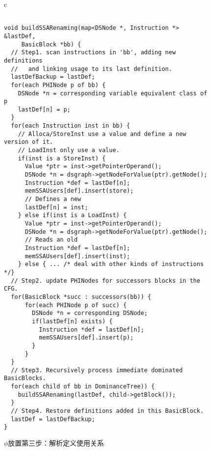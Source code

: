 \begin{figure}[htbp]
\centering
\begin{tabular}{c}
\begin{lstlisting}

void buildSSARenaming(map<DSNode *, Instruction *> &lastDef,
     BasicBlock *bb) {
  // Step1. scan instructions in 'bb', adding new definitions 
  //   and linking usage to its last definition.
  lastDefBackup = lastDef;
  for(each PHINode p of bb) {
    DSNode *n = corresponding variable equivalent class of p
    lastDef[n] = p;
  }
  for(each Instruction inst in bb) {
    // Alloca/StoreInst use a value and define a new version of it.
    // LoadInst only use a value.
    if(inst is a StoreInst) {
      Value *ptr = inst->getPointerOperand();
      DSNode *n = dsgraph->getNodeForValue(ptr).getNode();
      Instruction *def = lastDef[n];
      memSSAUsers[def].insert(store);
      // Defines a new
      lastDef[n] = inst;
    } else if(inst is a LoadInst) {
      Value *ptr = inst->getPointerOperand();
      DSNode *n = dsgraph->getNodeForValue(ptr).getNode();
      // Reads an old
      Instruction *def = lastDef[n];
      memSSAUsers[def].insert(inst);
    } else { ... /* deal with other kinds of instructions */}
  // Step2. update PHINodes for successors blocks in the CFG.
  for(BasicBlock *succ : successors(bb)) {
      for(each PHINode p of succ) {
        DSNode *n = corresponding DSNode;
        if(lastDef[n] exists) {
          Instruction *def = lastDef[n];
          memSSAUsers[def].insert(p);
        }
      }
  }
  // Step3. Recursively process immediate dominated BasicBlocks.
  for(each child of bb in DominanceTree)) {
    buildSSARenaming(lastDef, child->getBlock());
  }
  // Step4. Restore definitions added in this BasicBlock.
  lastDef = lastDefBackup;
}
\end{lstlisting}
\end{tabular}
\caption{$\phi$放置第三步：解析定义使用关系}\label{alg:phi3}
\end{figure}